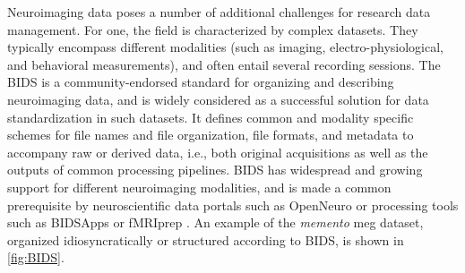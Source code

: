 Neuroimaging data poses a number of additional challenges for research data management.
For one, the field is characterized by complex datasets.
They typically encompass different modalities (such as imaging, electro-physiological, and behavioral measurements), and often entail several recording sessions.
The \gls{BIDS} \citep{gorgolewski2016brain} is a community-endorsed standard for organizing and describing neuroimaging data, and is widely considered as a successful solution for data standardization in such datasets.
It defines common and modality specific schemes for file names and file organization, file formats, and metadata to accompany raw  or derived data, i.e., both original acquisitions as well as the outputs of common processing pipelines.
\gls{BIDS} has widespread and growing support for different neuroimaging modalities, and is made a common prerequisite by neuroscientific data portals such as OpenNeuro \citep{markiewicz2021openneuro} or processing tools such as BIDSApps \citep{gorgolewski2017bids} or fMRIprep \citep{esteban2019fmriprep}.
An example of the \textit{memento} \gls{meg} dataset, organized idiosyncratically or structured according to \gls{BIDS}, is shown in \cref{fig:BIDS}. \\
